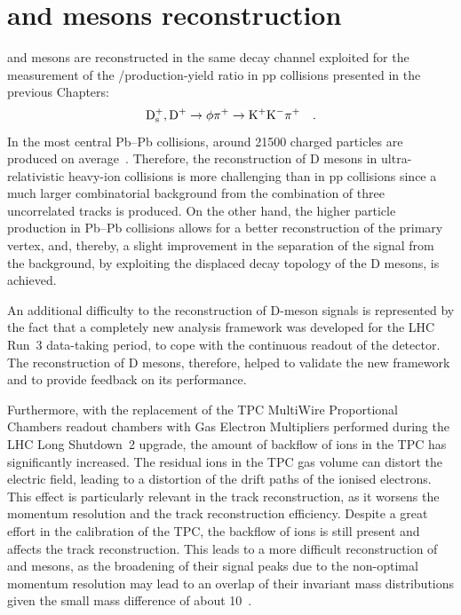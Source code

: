 \section{\texorpdfstring{\ds and \dpl mesons reconstruction}{Ds+ and D+ mesons reconstruction}}
\ds and \dpl mesons are reconstructed in the same decay channel exploited for the measurement of the \ds/\dpl production-yield ratio in pp collisions presented in the previous Chapters: 
\begin{equation*}
    \mathrm{D_s^+}, \mathrm{D^+} \rightarrow \mathrm{\phi\pi^+ \rightarrow K^+K^-\pi^+}\quad .
\end{equation*} 
In the most central Pb--Pb collisions, around 21500 charged particles are produced on average~\cite{ALICE:2016fbt}. Therefore, the reconstruction of D mesons in ultra-relativistic heavy-ion collisions is more challenging than in pp collisions since a much larger combinatorial background from the combination of three uncorrelated tracks is produced. On the other hand, the higher particle production in Pb--Pb collisions allows for a better reconstruction of the primary vertex, and, thereby, a slight improvement in the separation of the signal from the background, by exploiting the displaced decay topology of the D mesons, is achieved.

An additional difficulty to the reconstruction of D-meson signals is represented by the fact that a completely new analysis framework was developed for the LHC Run~3 data-taking period, to cope with the continuous readout of the detector. The reconstruction of D mesons, therefore, helped to validate the new framework and to provide feedback on its performance. 

Furthermore, with the replacement of the TPC MultiWire Proportional Chambers readout chambers with Gas Electron Multipliers performed during the LHC Long Shutdown~2 upgrade, the amount of backflow of ions in the TPC has significantly increased. The residual ions in the TPC gas volume can distort the electric field, leading to a distortion of the drift paths of the ionised electrons. This effect is particularly relevant in the track reconstruction, as it worsens the momentum resolution and the track reconstruction efficiency. Despite a great effort in the calibration of the TPC, the backflow of ions is still present and affects the track reconstruction. This leads to a more difficult reconstruction of \ds and \dpl mesons, as the broadening of their signal peaks due to the non-optimal momentum resolution may lead to an overlap of their invariant mass distributions given the small mass difference of about 10~\mevcc.


